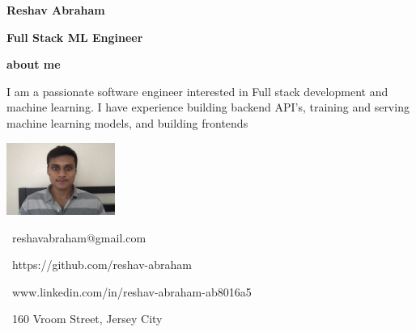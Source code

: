 \documentclass{article}
\begin{document}
    \begin{minipage}[t]{5.5in\linewidth}
    \Huge\vspace{0in}\hspace{-0.30em}\textbf{Reshav Abraham}  

    \vspace{0em}\hspace{-0.2em}\Large\textbf{Full Stack ML Engineer} 

    \vspace{0.5em}\hspace{0em}\small\textbf{about me} 

        \begin{minipage}[t]{0.6\textwidth\hspace{0em}}
        I am a passionate software engineer interested in Full stack development
        and machine learning. I have experience building backend API's, training and serving machine learning models, and building frontends \par
        \end{minipage}
    \end{minipage}
    \begin{minipage}[t]{3in\linewidth\hspace{-2.3em}}
        \small
        \strut\vspace*{-\baselineskip}\newline\includegraphics[width=1.4in]{reshav}

        \faEnvelopeO \, reshavabraham@gmail.com
        
        \faGithub\hspace \, https://github.com/reshav-abraham 

        \faLinkedin \, www.linkedin.com/in/reshav-abraham-ab8016a5

        \faHome \, 160 Vroom Street, Jersey City
    \end{minipage}

\vspace{1.3em}
\end{document}
